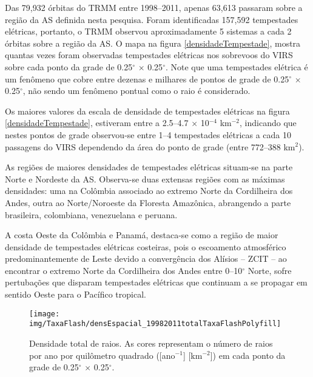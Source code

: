 Das 79,932 órbitas do TRMM entre 1998--2011, apenas 63,613 passaram sobre a região da AS definida nesta pesquisa. Foram identificadas 157,592 tempestades elétricas, portanto, o TRMM observou aproximadamente 5 sistemas a cada 2 órbitas sobre a região da AS. O mapa na figura \ref{densidadeTempestade}, mostra quantas vezes foram observadas tempestades elétricas nos sobrevoos do VIRS sobre cada ponto da grade de 0.25$^{\circ}$ $\times$ 0.25$^{\circ}$. Note que uma tempestades elétrica é um fenômeno que cobre entre dezenas e milhares de pontos de grade de 0.25$^{\circ}$ $\times$ 0.25$^{\circ}$, não sendo um fenômeno pontual como o raio é considerado.

Os maiores valores da escala de densidade de tempestades elétricas na figura \ref{densidadeTempestade}, estiveram entre a 2.5--4.7 $\times$ 10$^{-4}$ km$^{-2}$, indicando que nestes pontos de grade observou-se entre 1--4 tempestades elétricas a cada 10 passagens do VIRS dependendo da área do ponto de grade (entre 772--388 km$^2$).  

As regiões de maiores densidades de tempestades elétricas situam-se na parte Norte e Nordeste da AS. Observa-se duas extensas regiões com as máximas densidades: uma na Colômbia associado ao extremo Norte da Cordilheira dos Andes, outra ao Norte/Noroeste da Floresta Amazônica, abrangendo a parte brasileira, colombiana, venezuelana e peruana.  

A costa Oeste da Colômbia e Panamá, destaca-se como a região de maior densidade de tempestades elétricas costeiras, pois o escoamento atmosférico predominantemente de Leste devido a convergência dos Alísios -- ZCIT -- ao encontrar o extremo Norte da Cordilheira dos Andes entre 0--10$^{\circ}$ Norte, sofre pertubações que disparam tempestades elétricas que continuam a se propagar em sentido Oeste para o Pacífico tropical.  

\begin{figure}[!ht]
 \centering
  {\texttt{[image: img/TaxaFlash/densEspacial\_19982011totalTaxaFlashPolyfill]}}
  \caption{Densidade total de raios. As cores representam o número de raios por ano por quilômetro quadrado ([ano$^{-1}$] [km$^{-2}$]) em cada ponto da grade de 0.25$^{\circ}$ $\times$ 0.25$^{\circ}$. }
  \label{densidadeRaios}
\end{figure}


